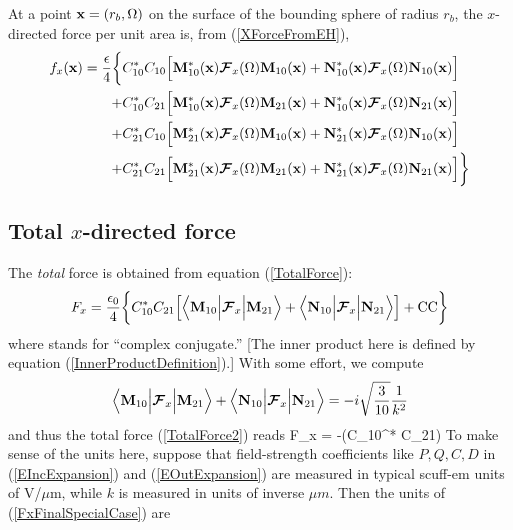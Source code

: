 \documentclass[letterpaper]{article}
\begin{document}
At a point $\mathbf{x}=(r_b, \Omega)$ on the surface of the bounding sphere
of radius $r_b$, the $x$-directed force per unit area is, from
(\ref{XForceFromEH}),
\begin{align*}
f_x(\mathbf{x})
=\frac{\epsilon}{4}
  \bigg\{  &C^*_{10} C_{10} 
            \Big[ \mathbf{M}_{10}^*(\mathbf{x}) \boldsymbol{\mathcal{F}}_x(\Omega) \mathbf{M}_{10}(\mathbf{x}) 
                  + \mathbf{N}_{10}^*(\mathbf{x}) \boldsymbol{\mathcal{F}}_x(\Omega) \mathbf{N}_{10}(\mathbf{x}) 
            \Big]
\\
          +&C^*_{10} C_{21} 
            \Big[ \mathbf{M}_{10}^*(\mathbf{x}) \boldsymbol{\mathcal{F}}_x(\Omega) \mathbf{M}_{21}(\mathbf{x}) 
                  + \mathbf{N}_{10}^*(\mathbf{x}) \boldsymbol{\mathcal{F}}_x(\Omega) \mathbf{N}_{21}(\mathbf{x})
            \Big]
\\
          +&C^*_{21} C_{10} 
            \Big[ \mathbf{M}_{21}^*(\mathbf{x}) \boldsymbol{\mathcal{F}}_x(\Omega) \mathbf{M}_{10}(\mathbf{x}) 
                  + \mathbf{N}_{21}^*(\mathbf{x}) \boldsymbol{\mathcal{F}}_x(\Omega) \mathbf{N}_{10}(\mathbf{x})
            \Big]
\\
          +&C^*_{21} C_{21} 
            \Big[ \mathbf{M}_{21}^*(\mathbf{x}) \boldsymbol{\mathcal{F}}_x(\Omega) \mathbf{M}_{21}(\mathbf{x}) 
                  + \mathbf{N}_{21}^*(\mathbf{x}) \boldsymbol{\mathcal{F}}_x(\Omega) \mathbf{N}_{21}(\mathbf{x})
            \Big]
  \bigg\}
\end{align*}

\subsection{Total $x$-directed force}

The \textit{total} force is obtained from equation (\ref{TotalForce}):
\begin{equation}
 F_x = 
\frac{\epsilon_0}{4}
 \bigg\{
       C_{10}^* C_{21}
       \Big[ \Big\langle \mathbf{M}_{10} \Big| \boldsymbol{\mathcal{F}}_x \Big| \mathbf{M}_{21} \Big\rangle
            +\Big\langle \mathbf{N}_{10} \Big| \boldsymbol{\mathcal{F}}_x \Big| \mathbf{N}_{21} \Big\rangle
       \Big]
       + \text{CC}
 \bigg\}
\label{TotalForce2}
\end{equation}
where  stands for ``complex conjugate.''
[The inner product here is defined by equation 
 (\ref{InnerProductDefinition}).]
With some effort, we compute
$$
 \Big\langle \mathbf{M}_{10} \Big| \boldsymbol{\mathcal{F}}_x \Big| \mathbf{M}_{21} \Big\rangle
      +\Big\langle \mathbf{N}_{10} \Big| \boldsymbol{\mathcal{F}}_x \Big| \mathbf{N}_{21} \Big\rangle
 =-i\sqrt\frac{3}{10} \frac{1}{k^2}
$$
and thus the total force (\ref{TotalForce2}) reads
{
 F_x = -\sqrt{}\Big(C_{10}^* C_{21}\Big)
}
To make sense of the units here, suppose that field-strength
coefficients like $P,Q,C,D$ in (\ref{EIncExpansion}) and 
(\ref{EOutExpansion}) are measured in typical {\sc scuff-em}
units of V/$\mu $m, while $k$ is measured in units of 
inverse $\mu m$. Then the units of (\ref{FxFinalSpecialCase}) are
\end{document}
